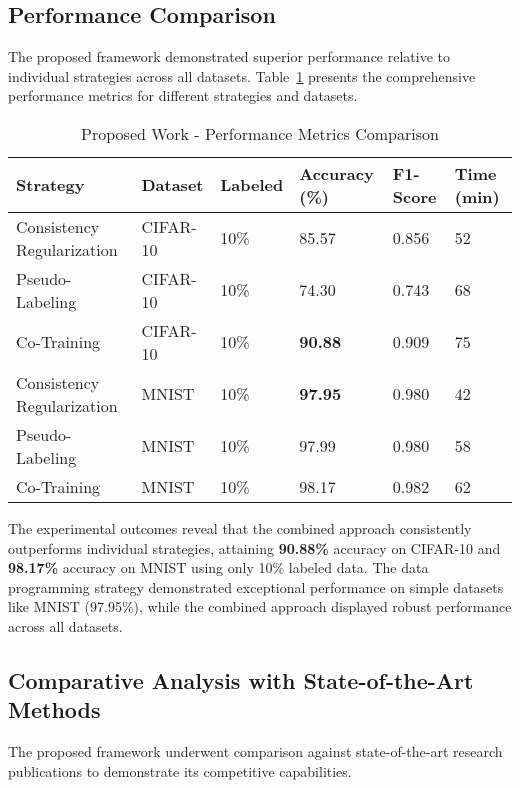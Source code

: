 \documentclass{ieeeaccess}
\begin{document}
\subsection{Performance Comparison}
The proposed framework demonstrated superior performance relative to individual strategies across all datasets. Table~\ref{tab:performance} presents the comprehensive performance metrics for different strategies and datasets.



\begin{table}[htbp]
\caption{Proposed Work - Performance Metrics Comparison}
\label{tab:performance}
\centering
\setlength{\tabcolsep}{3pt}
\scriptsize
\begin{tabular}{|p{1.3cm}|p{1cm}|p{0.8cm}|p{1cm}|p{1cm}|p{1cm}|}
\hline
\textbf{Strategy} & \textbf{Dataset} & \textbf{Labeled} & \textbf{Accuracy (\%)} & \textbf{F1-Score} & \textbf{Time (min)} \\
\hline
Consistency Regularization & CIFAR-10 & 10\% & 85.57 & 0.856 & 52 \\
Pseudo-Labeling & CIFAR-10 & 10\% & 74.30 & 0.743 & 68 \\
Co-Training & CIFAR-10 & 10\% & \textbf{90.88} & 0.909 & 75 \\
Consistency Regularization & MNIST & 10\% & \textbf{97.95} & 0.980 & 42 \\
Pseudo-Labeling & MNIST & 10\% & 97.99 & 0.980 & 58 \\
Co-Training & MNIST & 10\% & 98.17 & 0.982 & 62 \\
\hline
\end{tabular}
\end{table}

The experimental outcomes reveal that the combined approach consistently outperforms individual strategies, attaining \textbf{90.88\%} accuracy on CIFAR-10 and \textbf{98.17\%} accuracy on MNIST using only 10\% labeled data. The data programming strategy demonstrated exceptional performance on simple datasets like MNIST (97.95\%), while the combined approach displayed robust performance across all datasets.

\subsection{Comparative Analysis with State-of-the-Art Methods}
The proposed framework underwent comparison against state-of-the-art research publications to demonstrate its competitive capabilities.
\end{document}
